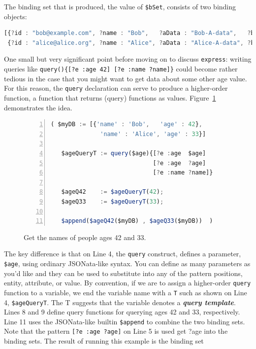 \documentclass[10pt,letterpaper]{article} %
\newcommand{\stt}[1]{\texttt{#1}} %
\newcommand{\bdef}[1]{\textbf{\textit{#1}}}
\begin{document}
The binding set that is produced, the value of \stt{\$bSet}, consists of two binding objects:

\begin{lstlisting}[language=JavaScript,numbers=none,basicstyle=\ttfamily\scriptsize]
[{?id : "bob@example.com", ?name : "Bob",   ?aData : "Bob-A-data",   ?bData : "Bob-B-data"  },
 {?id : "alice@alice.org", ?name : "Alice", ?aData : "Alice-A-data", ?bData : "Alice-B-data"}]
\end{lstlisting} \vspace{-2em}

One small but very significant point before moving on to discuss \stt{express}:
writing queries like \stt{query()\{[?e :age 42] [?e :name ?name]\}} could become rather tedious in the case that you might want to get data about some other age value.
For this reason, the \stt{query} declaration can serve to produce a higher-order function, a function that returns (query) functions as values. Figure~\ref{code:higher-order-query} demonstrates the idea.


\begin{figure}[H]
    \caption{Get the names of people ages 42 and 33.}
    \label{code:higher-order-query}
\begin{lstlisting}[language=JavaScript,numberstyle=\scriptsize,basicstyle=\ttfamily\scriptsize,numbers=left,stepnumber=1,breaklines=true]
 ( $myDB := [{'name' : 'Bob',   'age' : 42},
              'name' : 'Alice', 'age' : 33}]

   $ageQueryT := query($age){[?e :age  $age]
                             [?e :age  ?age]
                             [?e :name ?name]}

   $ageQ42    := $ageQueryT(42);
   $ageQ33    := $ageQueryT(33);

   $append($ageQ42($myDB) , $ageQ33($myDB))  )
\end{lstlisting}
\end{figure} \vspace{-3em}

The key difference is that on Line 4, the \stt{query} construct, defines a parameter, \stt{\$age}, using ordinary JSONata-like syntax.
You can define as many parameters as you'd like and they can be used to substitute into any of the pattern positions, entity, attribute, or value.
By convention, if we are to assign a higher-order \stt{query} function to a variable, we end the variable name with a \stt{T} such as shown on Line 4, \stt{\$ageQueryT}.
The T suggests that the variable denotes a \bdef{query template}.
Lines 8 and 9 define query functions for querying ages 42 and 33, respectively.
Line 11 uses the JSONata-like builtin \stt{\$append} to combine the two binding sets.
Note that the pattern \stt{[?e :age ?age]} on Line 5 is used get ?age into the binding sets.
The result of running this example is the binding set
\end{document}
